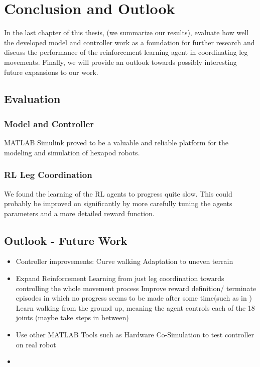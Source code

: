 \chapter{Conclusion and Outlook}
\label{ch:conclusion}

In the last chapter of this thesis, (we summarize our results), evaluate how well the developed model and controller work as a foundation for further research and discuss the performance of the reinforcement learning agent in coordinating leg movements.
Finally, we will provide an outlook towards possibly interesting future expansions to our work.


\section{Evaluation}

\subsection{Model and Controller}
MATLAB Simulink proved to be a valuable and reliable platform for the modeling and simulation of hexapod robots.

\subsection{RL Leg Coordination}
We found the learning of the RL agents to progress quite slow. 
This could probably be improved on significantly by more carefully tuning the agents parameters and a more detailed reward function.



\section{Outlook - Future Work}



\begin{itemize}
	
	\item Controller improvements:
		\subitem Curve walking
		\subitem Adaptation to uneven terrain
		\subitem 
	
	\item Expand Reinforcement Learning from just leg coordination towards controlling the whole movement process
		\subitem Improve reward definition/ terminate episodes in which no progress seems to be made after some time(such as in \cite{lillicrap2015continuous})
		\subitem Learn walking from the ground up, meaning the agent controls each of the 18 joints (maybe take steps in between)
		\subitem
	
	\item Use other MATLAB Tools such as Hardware Co-Simulation to test controller on real robot
	
	\item 
	
\end{itemize}